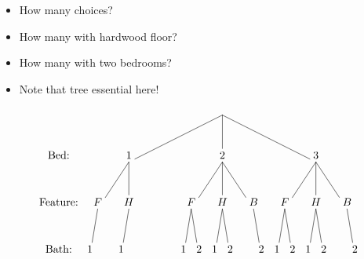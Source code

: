 \documentclass{beamer}
\theoremstyle{definition}
\begin{document}
\begin{frame}
\begin{itemize}
\item How many choices?
\item How many with hardwood floor?
\only<+->{\alert{$5$}}
\item How many with two bedrooms?
\item Note that tree essential here!
\end{itemize}
\[\begin{xy}<.5cm,0cm>:
(8.5,0)="0";
(2.5,-3)="1";
(8.5,-3)="2";
(14.5,-3)="3";
"0";"1"*+!D{1}**\dir{-};
"0";"2"*+!D{2}**\dir{-};
"0";"3"*+!D{3}**\dir{-};
(.5,-6)="11";
(2.5,-6)="12";
(4.5,-6)="13";
(6.5,-6)="21";
(8.5,-6)="22";
(10.5,-6)="23";
(12.5,-6)="31";
(14.5,-6)="32";
(16.5,-6)="33";
"1";"11"*+!D{F}**\dir{-};
"1";"12"*+!D{H}**\dir{-};
"2";"21"*+!D{F}**\dir{-};
"2";"22"*+!D{H}**\dir{-};
"2";"23"*+!D{B}**\dir{-};
"3";"31"*+!D{F}**\dir{-};
"3";"32"*+!D{H}**\dir{-};
"3";"33"*+!D{B}**\dir{-};
"11";(0,-9)*+!D{1}**\dir{-};
"12";(2,-9)*+!D{1}**\dir{-};
"21";(6,-9)*+!D{1}**\dir{-};
"21";(7,-9)*+!D{2}**\dir{-};
"22";(8,-9)*+!D{1}**\dir{-};
"22";(9,-9)*+!D{2}**\dir{-};
"23";(11,-9)*+!D{2}**\dir{-};
"31";(12,-9)*+!D{1}**\dir{-};
"31";(13,-9)*+!D{2}**\dir{-};
"32";(14,-9)*+!D{1}**\dir{-};
"32";(15,-9)*+!D{2}**\dir{-};
"33";(17,-9)*+!D{2}**\dir{-};
(-2,-3)*+!D{\text{Bed:}};
(-2,-6)*+!D{\text{Feature:}};
(-2,-9)*+!D{\text{Bath:}};
\end{xy}\]
\end{frame}
\end{document}
